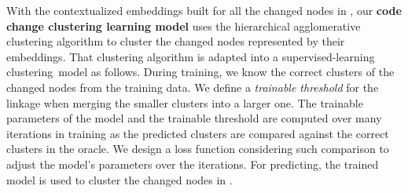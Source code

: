 




With the contextualized embeddings built for all the changed nodes in
{\mvpdg}, our {\bf code change clustering learning model} uses the
hierarchical agglomerative clustering algorithm to cluster the changed
nodes represented by their embeddings. That clustering algorithm is
adapted into a supervised-learning clustering~model as follows.
%
During training, we know the correct clusters of the changed
nodes from the training data. We define a {\em trainable threshold}
for the linkage when merging the smaller clusters into a larger
one. The trainable parameters of the model and the trainable threshold
are computed over many iterations in training as the predicted
clusters are compared against the correct clusters in the oracle. We
design a loss function considering such comparison to adjust the
model's parameters over the iterations.  For predicting, the trained
model is used to cluster the changed nodes in {\mvpdg}.


